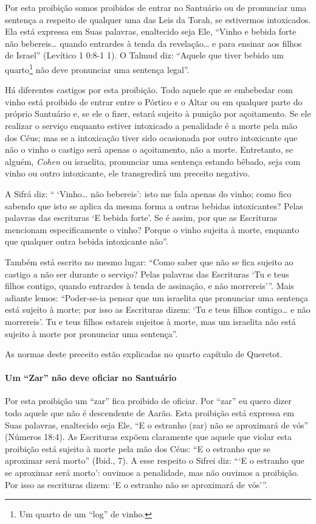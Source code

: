 Por esta proibição somos proibidos de entrar no Santuário ou de
pronunciar uma sentença a respeito de qualquer uma das Leis da Torah, se
estivermos intoxicados. Ela está expressa em Suas palavras, enaltecido
seja Ele, ``Vinho e bebida forte não bebereis\ldots{} quando entrardes à
tenda da revelação\ldots{} e para ensinar aos filhos de Israel'' (Levítico 1
0:8-1 1). O Talmud diz: ``Aquele que tiver bebido um
quarto\footnote{Um quarto de um ``log'' de vinho.} não deve pronunciar uma sentença legal''.

Há diferentes castigos por esta proibição. Todo aquele que se embebedar
com vinho está proibido de entrar entre o Pórtico e o Altar ou em
qualquer parte do próprio Santuário e, se ele o fizer, estará sujeito à
punição por açoitamento. Se ele realizar o serviço enquanto estiver
intoxicado a penalidade é a morte pela mão dos Céus; mas se a
intoxicação tiver sido ocasionada por outro intoxicante que não o vinho
o castigo será apenas o açoitamento, não a morte. Entretanto, se alguém,
\textit{Cohen} ou israelita, pronunciar uma sentença estando bêbado, seja
com vinho ou outro intoxicante, ele transgredirá um preceito negativo.

A Sifrá diz: `` `Vinho\ldots{} não bebereis': isto me fala apenas do vinho;
como fico sabendo que isto se aplica da mesma forma a outras bebidas
intoxicantes? Pelas palavras das escrituras `E bebida forte'. Se é
assim, por que as Escrituras mencionam especificamente o vinho? Porque
o vinho sujeita à morte, enquanto que qualquer outra bebida intoxicante
não''.

Também está escrito no mesmo lugar: ``Como saber que não se fica sujeito
ao castigo a não ser durante o serviço? Pelas palavras das Escrituras
`Tu e teus filhos contigo, quando entrardes à tenda de assinação, e não
morrereis'''. Mais adiante lemos: ``Poder-se-ia pensar que um israelita
que pronunciar uma sentença está sujeito à morte; por isso as Escrituras
dizem: `Tu e teus filhos contigo\ldots{} e não morrereis'. Tu e teus filhos
estareis sujeitos à morte, mas um israelita não está sujeito à morte
por pronunciar uma sentença''.

As normas deste preceito estão explicadas no quarto capítulo de Queretot.

\paragraph{Um ``Zar'' não deve oficiar no Santuário}

Por esta proibição um ``zar'' fica proibido de oficiar. Por ``zar'' eu
quero dizer todo aquele que não é descendente de Aarão. Esta proibição
está expressa em Suas palavras, enaltecido seja Ele, ``E o estranho
(zar) não se aproximará de vós'' (Números 18:4). As Escrituras expõem claramente que
aquele que violar esta proibição está sujeito à morte pela mão dos Céus:
``E o estranho que se aproximar será morto'' (Ibid., 7). A esse respeito
o Sifrei diz: ```E o estranho que se aproximar será morto': ouvimos a
penalidade, mas não ouvimos a proibição. Por isso as escrituras dizem:
`E o estranho não se aproximará de vós'''.

